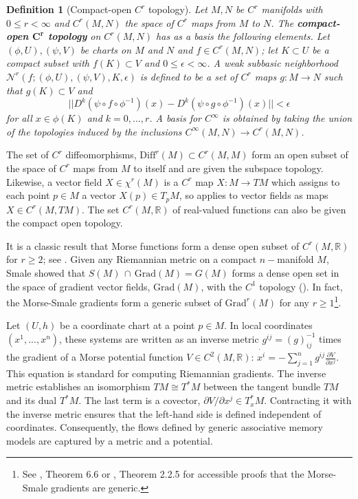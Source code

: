 \documentclass[12pt]{article}
\newtheorem{definition}[theorem]{Definition}
\begin{document}
\begin{definition}[Compact-open $C^r$ topology]
\label{definition:compact-open-topology}
    Let $M,N$ be $C^r$ manifolds with $0 \leq r < \infty$ and $C^r(M,N)$ the space of $C^r$ maps from $M$ to $N$. The \textbf{\textit{compact-open $\mathbf{C^r}$ topology}} on $C^r(M,N)$ has as a basis the following elements. Let $(\phi,U),(\psi,V)$ be charts on $M$ and $N$ and $f \in C^r(M,N)$; let $K\subset U$ be a compact subset with $f(K) \subset V$ and $0\leq \epsilon < \infty$. A weak subbasic neighborhood $\mathcal{N}^r(f;(\phi,U),(\psi,V),K,\epsilon)$ is defined to be a set of $C^r$ maps $g:M \rightarrow N$ such that $g(K) \subset V$ and
\begin{equation*}
    || D^k(\psi \circ f \circ \phi^{-1})(x) - D^k(\psi\circ g\circ \phi^{-1})(x) || < \epsilon
\end{equation*}
for all $x \in \phi(K)$ and $k = 0,...,r$. A basis for $C^{\infty}$ is obtained by taking the union of the topologies induced by the inclusions $C^{\infty}(M,N) \rightarrow C^{r}(M,N)$.
\end{definition}

The set of $C^r$ diffeomorphisms, $\text{Diff}^r(M)\subset C^r(M,M)$ form an open subset of the space of $C^r$ maps from $M$ to itself and are given the subspace topology. Likewise, a vector field $X \in \chi^r(M)$ is a $C^r$ map $X: M \rightarrow TM$ which assigns to each point $p \in M$ a vector $X(p) \in T_pM$, so  applies to vector fields as maps ${X \in C^r(M,TM)}$. The set $C^{r}(M,\mathbb{R})$ of real-valued functions can also be given the compact open topology. 

It is a classic result that Morse functions form a dense open subset of $C^{r}(M,\mathbb{R})$ for $r \geq 2$; see . Given any Riemannian metric on a compact $n-$manifold $M$, Smale showed that $S(M) \, \cap \, \text{Grad}(M) = G(M)$ forms a dense open set in the space of gradient vector fields, $\text{Grad}(M)$, with the $C^1$ topology (\cite{smale1961gradient,PALIS1969385}). In fact, the Morse-Smale gradients form a generic subset of $\text{Grad}^r(M)$ for any $r \geq 1$\footnote{See \cite{banyaga2004lectures}, Theorem 6.6 or \cite{audin2014morse}, Theorem 2.2.5 for accessible proofs that the Morse-Smale gradients are generic.}. 

Let $(U,h)$ be a coordinate chart at a point $p \in M$. In local coordinates $(x^1,...,x^n)$, these systems are written as an inverse metric $g^{ij} = (g)^{-1}_{ij}$ times the gradient of a Morse potential function $V\in C^2(M,\mathbb{R})$: $\dot{x^{i}} = -\sum_{j=1}^{n} g^{ij}\frac{\partial V}{\partial x^j}$. This equation is standard for computing Riemannian gradients. The inverse metric establishes an isomorphism $TM \cong T^*M$ between the tangent bundle $TM$ and its dual $T^*M$. The last term is a covector, ${\partial V}/{\partial x^j} \in T^*_xM$. Contracting it with the inverse metric ensures that the left-hand side is defined independent of coordinates. Consequently, the flows defined by generic associative memory models are captured by a metric and a potential. 
\end{document}
